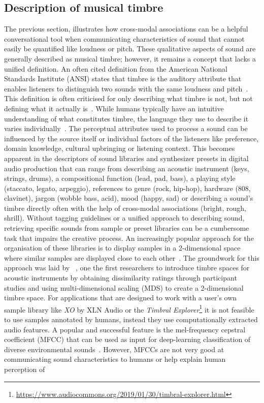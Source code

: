 \documentclass[]{interact}
\theoremstyle{plain}%
\theoremstyle{definition}
\theoremstyle{remark}
\begin{document}
\subsection{Description of musical timbre}\label{subsec:musical_timbre}
The previous section, illustrates how cross-modal associations can be a helpful conversational tool when communicating characteristics of sound that cannot easily be quantified like loudness or pitch. These qualitative aspects of sound are generally described as musical timbre; however, it remains a concept that lacks a unified definition. An often cited definition from the American National Standards Institute (ANSI) states that timbre is the auditory attribute that enables listeners to distinguish two sounds with the same loudness and pitch~\cite{}. This definition 
is often criticised for only describing what timbre is not, but not defining what it actually is~\cite{bregman_or_siedenburg}. While humans typically have an intuitive understanding of what constitutes timbre, the language they use to describe it varies individually~\cite{saitisTimbreSemanticsLens2018}. The perceptual attributes used to process a sound can be influenced by the source itself or individual factors of the listeners like preference, domain knowledge, cultural upbringing or listening context. This becomes apparent in the descriptors of sound libraries and synthesizer presets in digital audio production that can range from describing an acoustic instrument (keys, strings, drums), a compositional function (lead, pad, bass), a playing style (staccato, legato, arpeggio), references to genre (rock, hip-hop), hardware (808, clavinet), jargon (wobble bass, acid), mood (happy, sad) or describing a sound's timbre directly often with the help of cross-modal associations (bright, rough, shrill). Without tagging guidelines or a unified approach to describing sound, retrieving specific sounds from sample or preset libraries can be a cumbersome task that impairs the creative process. An increasingly popular approach for the organisation of these libraries is to display samples in a 2-dimensional space where similar samples are displayed close to each other~\cite{friedAudioQuilt2DArrangements, brufordGrooveExplorerIntelligent2019, garberAudioStellarOpenSource, XO}. The groundwork for this approach was laid by ~, one the first researchers to introduce timbre spaces for acoustic instruments by obtaining dissimilarity ratings through participant studies and using multi-dimensional scaling (MDS) to create a 2-dimensional timbre space. For applications that are designed to work with a user's own sample library like \textit{XO} by XLN Audio or the \textit{Timbral Explorer}\footnote{\url{https://www.audiocommons.org/2019/01/30/timbral-explorer.html}} it is not feasible to use samples annotated by humans, instead they use computationally extracted audio features. A popular and successful feature is the mel-frequency cepstral coefficient (MFCC) that can be used as input for deep-learning classification of diverse environmental sounds~\cite{openl3}. However, MFCCs are not very good at communicating sound characteristics to humans or help explain human perception of 
\end{document}
